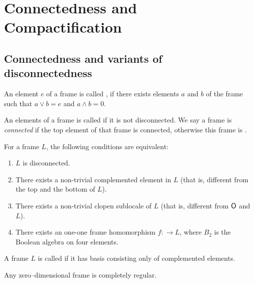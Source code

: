 \chapter{Connectedness and Compactification}

\section{Connectedness and variants of disconnectedness}
\begin{definition}
    An element $e$ of a frame is called , if there exists elements $a$ and $b$ of the frame such that $a\vee b = e$ and $a\wedge b = 0$.

    An elements of a frame is called  if it is not disconnected. We say a frame is \emph{connected} if the top element of that frame is connected, otherwise this frame is .
\end{definition}

\begin{observation}\label{p:disconnectednessEquivalently}
    For a frame $L$, the following conditions are equivalent:

    \begin{enumerate}
        \item $L$ is disconnected.
        \item There exists a non-trivial complemented element in $L$ (that is, different from the top and the bottom of $L$).
        \item There exists a non-trivial clopen sublocale of $L$ (that is, different from $\mathsf{O}$ and $L$).
        \item There exists an one-one frame homomorphism $f\colon $$ \to L$, where $B_2$ is the Boolean algebra on four elements.
    \end{enumerate}
\end{observation}

\begin{definition}
    A frame $L$ is called  if it has basis consisting only of complemented elements.
\end{definition}

\begin{observation}
    Any zero--dimensional frame is completely regular.
\end{observation}

